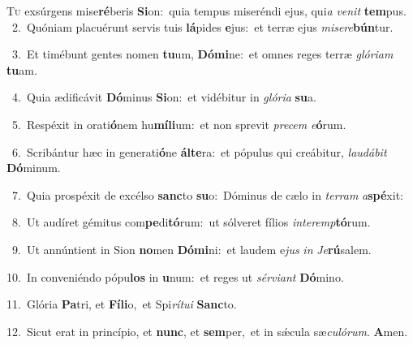 \lettrine{\initial\textcolor{\initialcolor}{T}}{u} exsúrgens mise\-\textbf{ré}\-beris \textbf{Si}\-on:~\star quia tempus miseréndi ejus, qui\textit{a} \textit{ve}\-\textit{nit} \textbf{tem}\-pus.\\
{\numbfont\textcolor{\numbcolor}{~2.}}~Quóniam placuérunt servis tuis \textbf{lá}\-pides \textbf{e}\-jus:~\star et terræ ejus \textit{mi}\-\textit{se}\textit{re}\textbf{bún}tur.\par
{\numbfont\textcolor{\numbcolor}{~3.}}~Et timébunt gentes nomen \textbf{tu}\-um, \textbf{Dó}\-\textbf{mi}ne:~\star et omnes reges terræ \textit{gló}\-\textit{ri}\textit{am} \textbf{tu}\-am.\par
{\numbfont\textcolor{\numbcolor}{~4.}}~Quia ædificávit \textbf{Dó}\-minus \textbf{Si}\-on:~\star et vidébitur in \textit{gló}\-\textit{ri}\textit{a} \textbf{su}\-a.\par
{\numbfont\textcolor{\numbcolor}{~5.}}~Respéxit in orati\-\textbf{ó}\-nem hu\-\textbf{mí}\-\textbf{li}um:~\star et non sprevit \textit{pre}\-\textit{cem} \textit{e}\-\textbf{ó}rum.\par
{\numbfont\textcolor{\numbcolor}{~6.}}~Scribántur hæc in generati\-\textbf{ó}\-ne \textbf{ál}\-\textbf{te}ra:~\star et pópulus qui creábitur, \textit{lau}\-\textit{dá}\textit{bit} \textbf{Dó}\-minum.\par
{\numbfont\textcolor{\numbcolor}{~7.}}~Quia prospéxit de excélso \textbf{sanc}\-to \textbf{su}\-o:~\star Dóminus de cælo in \textit{ter}\-\textit{ram} \textit{a}\-\textbf{spé}xit:\par
{\numbfont\textcolor{\numbcolor}{~8.}}~Ut audíret gémitus com\-\textbf{pe}\-di\-\textbf{tó}\-rum:~\star ut sólveret fílios \textit{in}\-\textit{ter}\textit{emp}\textbf{tó}rum.\par
{\numbfont\textcolor{\numbcolor}{~9.}}~Ut annúntient in Sion \textbf{no}\-men \textbf{Dó}\-\textbf{mi}ni:~\star et laudem e\textit{jus} \textit{in} \textit{Je}\-\textbf{rú}salem.\par
{\numbfont\textcolor{\numbcolor}{10.}}~In conveniéndo pópu\textbf{los} in \textbf{u}\-num:~\star et reges ut \textit{sér}\-\textit{vi}\textit{ant} \textbf{Dó}\-mino.\par
{\numbfont\textcolor{\numbcolor}{11.}}~Glória \textbf{Pa}\-tri, et \textbf{Fí}\-\textbf{li}o,~\star et Spi\-\textit{rí}\-\textit{tu}\textit{i} \textbf{Sanc}\-to.\par
{\numbfont\textcolor{\numbcolor}{12.}}~Sicut erat in princípio, et \textbf{nunc}\-, et \textbf{sem}\-per,~\star et in sǽcula sæ\-\textit{cu}\-\textit{ló}\textit{rum}. \textbf{A}\-men.\par
